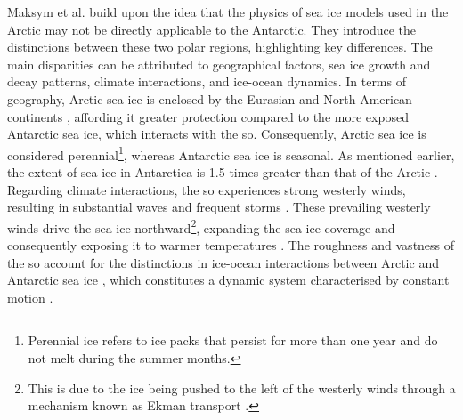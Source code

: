 Maksym et al. \cite{Maksym2012} build upon the idea that the physics of sea ice models used in the Arctic may not be directly applicable to the Antarctic. They introduce the distinctions between these two polar regions, highlighting key differences. The main disparities can be attributed to geographical factors, sea ice growth and decay patterns, climate interactions, and ice-ocean dynamics. In terms of geography, Arctic sea ice is enclosed by the Eurasian and North American continents \cite{Maksym2012, Parkinson2004}, affording it greater protection compared to the more exposed Antarctic sea ice, which interacts with the \acs{so}. Consequently, Arctic sea ice is considered perennial\footnote{Perennial ice refers to ice packs that persist for more than one year and do not melt during the summer months.}, whereas Antarctic sea ice is seasonal. As mentioned earlier, the extent of sea ice in Antarctica is 1.5 times greater than that of the Arctic \cite{Thomas2017Chap8}. Regarding climate interactions, the \acs{so} experiences strong westerly winds, resulting in substantial waves and frequent storms \cite{Maksym2012}. These prevailing westerly winds drive the sea ice northward\footnote{This is due to the ice being pushed to the left of the westerly winds through a mechanism known as Ekman transport \cite{Maksym2012}.}, expanding the sea ice coverage and consequently exposing it to warmer temperatures \cite{Parkinson2004, Maksym2012}. The roughness and vastness of the \acs{so} account for the distinctions in ice-ocean interactions between Arctic and Antarctic sea ice \cite{Parkinson2004}, which constitutes a dynamic system characterised by constant motion \cite{Maksym2012}.


